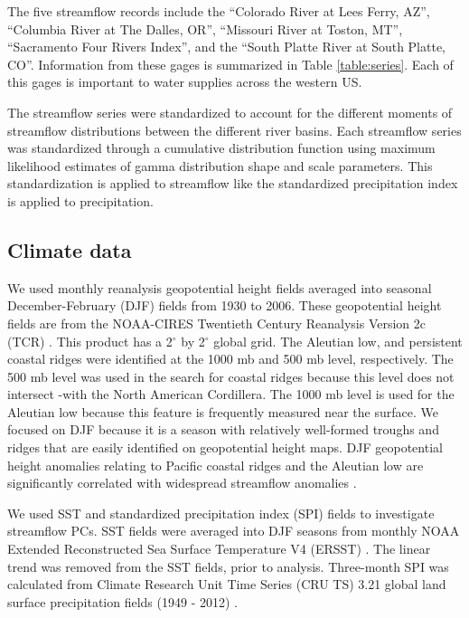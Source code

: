 \documentclass[final, double]{ua-thesis}
\begin{document}
The five streamflow records include the ``Colorado River at Lees Ferry, AZ'', ``Columbia River at The Dalles, OR'', ``Missouri River at Toston, MT'', ``Sacramento Four Rivers Index'', and the ``South Platte River at South Platte, CO''. Information from these gages is summarized in Table \ref{table:series}. Each of this gages is important to water supplies across the western US.

The streamflow series were standardized to account for the different moments of streamflow distributions between the different river basins. Each streamflow series was standardized through a cumulative distribution function using maximum likelihood estimates of gamma distribution shape and scale parameters. This standardization is applied to streamflow like the standardized precipitation index \citep{2mckee_relationship_1993} is applied to precipitation.


\subsection{Climate data}

We used monthly reanalysis geopotential height fields averaged into seasonal December-February (DJF) fields from 1930 to 2006. These geopotential height fields are from the NOAA-CIRES Twentieth Century Reanalysis Version 2c (TCR) \citep{2compo_twentieth_2011}. This product has a 2$^{\circ}$ by 2$^{\circ}$ global grid. The Aleutian low, and persistent coastal ridges were identified at the 1000 mb and 500 mb level, respectively. The 500 mb level was used in the search for coastal ridges because this level does not intersect -with the North American Cordillera. The 1000 mb level is used for the Aleutian low because this feature is frequently measured near the surface. We focused on DJF because it is a season with relatively well-formed troughs and ridges that are easily identified on geopotential height maps. DJF geopotential height anomalies relating to Pacific coastal ridges and the Aleutian low are significantly correlated with widespread streamflow anomalies \citep{2malevich_pacific_2016}.

We used SST and standardized precipitation index (SPI) fields to investigate streamflow PCs. SST fields were averaged into DJF seasons from monthly NOAA Extended Reconstructed Sea Surface Temperature V4 (ERSST) \citep{2huang_extended_2014, 2liu_extended_2014, 2huang_further_2015}. The linear trend was removed from the SST fields, prior to analysis. Three-month SPI was calculated from Climate Research Unit Time Series (CRU TS) 3.21 global land surface precipitation fields (1949 - 2012) \citep{2oloughlin_climate_2012, 2cisl_rda_ds2980}.
\end{document}
